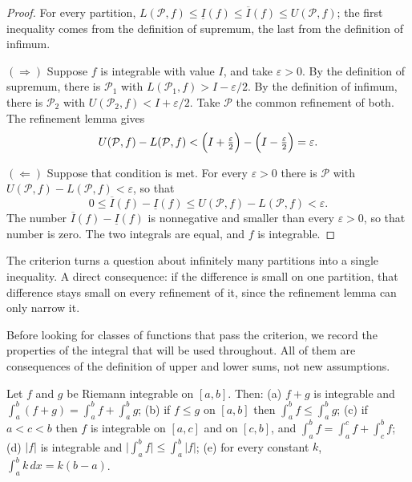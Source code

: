 \begin{proof}
For every partition,
$L(\mathcal{P},f)\le\underline{I}(f)\le\overline{I}(f)\le U(\mathcal{P},f)$; the first inequality
comes from the definition of supremum, the last from the definition of infimum.

$(\Rightarrow)$ Suppose $f$ is integrable with value $I$, and take
$\varepsilon>0$. By the definition of supremum, there is $\mathcal{P}_1$ with
$L(\mathcal{P}_1,f)>I-\varepsilon/2$. By the definition of infimum, there is $\mathcal{P}_2$
with $U(\mathcal{P}_2,f)<I+\varepsilon/2$. Take $\mathcal{P}$ the common refinement
of both. The refinement lemma gives
\[
U(\mathcal{P},f)-L(\mathcal{P},f)
<\Bigl(I+\tfrac{\varepsilon}{2}\Bigr)-\Bigl(I-\tfrac{\varepsilon}{2}\Bigr)
=\varepsilon .
\]

$(\Leftarrow)$ Suppose that condition is met. For every $\varepsilon>0$ there is
$\mathcal{P}$ with $U(\mathcal{P},f)-L(\mathcal{P},f)<\varepsilon$, so that
\[
0\le\overline{I}(f)-\underline{I}(f)\le U(\mathcal{P},f)-L(\mathcal{P},f)<\varepsilon .
\]
The number $\overline{I}(f)-\underline{I}(f)$ is nonnegative and smaller than every
$\varepsilon>0$, so that number is zero. The two integrals are equal, and $f$ is integrable.
\end{proof}

The criterion turns a question about infinitely many partitions into a single
inequality. A direct consequence: if the difference is small on one partition, that difference
stays small on every refinement of it, since the refinement lemma can only
narrow it.

Before looking for classes of functions that pass the criterion, we record the properties of the integral
that will be used throughout. All of them are consequences of the definition of upper and lower sums, not new
assumptions.

\begin{proposisi}
Let $f$ and $g$ be Riemann integrable on $[a,b]$. Then:
(a) $f+g$ is integrable and $\int_a^b(f+g)=\int_a^b f+\int_a^b g$;
(b) if $f\le g$ on $[a,b]$ then $\int_a^b f\le\int_a^b g$;
(c) if $a<c<b$ then $f$ is integrable on $[a,c]$ and on $[c,b]$, and
$\int_a^b f=\int_a^c f+\int_c^b f$;
(d) $|f|$ is integrable and $\bigl|\int_a^b f\bigr|\le\int_a^b|f|$;
(e) for every constant $k$, $\int_a^b k\,dx=k(b-a)$.
\end{proposisi}

